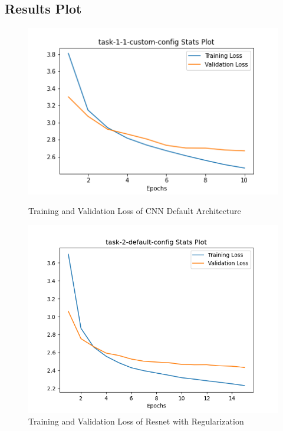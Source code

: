 \documentclass{article}
\begin{document}
    \subsection{Results Plot}
    \begin{figure}[H]
        \begin{minipage}[b]{0.5\linewidth}
            \centering
            \includegraphics[width=\textwidth]{./stat_plot_CNNdefault.png}
            \caption{Training and Validation Loss of CNN Default Architecture}
            \label{fig:figure1}
        \end{minipage}
        \hspace{0.2cm}
        \begin{minipage}[b]{0.5\linewidth}
            \centering
            \includegraphics[width=\textwidth]{./stat_plot_ResnetReg.png}
            \caption{Training and Validation Loss of Resnet with Regularization}
            \label{fig:figure2}
        \end{minipage}
    \end{figure}
\end{document}
